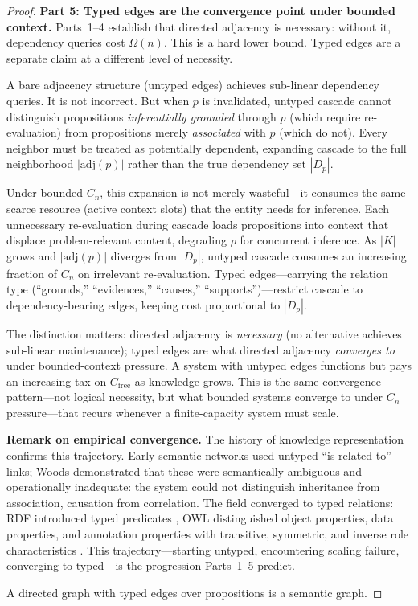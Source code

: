 \documentclass[11pt]{article}
\theoremstyle{definition}
\begin{document}
\begin{proof}
\textbf{Part 5: Typed edges are the convergence point under bounded
context.}
Parts~1--4 establish that directed adjacency is necessary: without it,
dependency queries cost $\Omega(n)$. This is a hard lower bound. Typed
edges are a separate claim at a different level of necessity.

A bare adjacency structure (untyped edges) achieves sub-linear
dependency queries. It is not incorrect. But when $p$ is invalidated,
untyped cascade cannot distinguish propositions \emph{inferentially
grounded} through $p$ (which require re-evaluation) from propositions
merely \emph{associated} with $p$ (which do not). Every neighbor must
be treated as potentially dependent, expanding cascade to the full
neighborhood $|\mathrm{adj}(p)|$ rather than the true dependency set
$|D_p|$.

Under bounded $C_n$, this expansion is not merely wasteful---it
consumes the same scarce resource (active context slots) that the
entity needs for inference. Each unnecessary re-evaluation during
cascade loads propositions into context that displace
problem-relevant content, degrading $\rho$ for concurrent inference.
As $|K|$ grows and $|\mathrm{adj}(p)|$ diverges from $|D_p|$, untyped
cascade consumes an increasing fraction of $C_n$ on irrelevant
re-evaluation. Typed edges---carrying the relation type (``grounds,''
``evidences,'' ``causes,'' ``supports'')---restrict cascade to
dependency-bearing edges, keeping cost proportional to $|D_p|$.

The distinction matters: directed adjacency is \emph{necessary} (no
alternative achieves sub-linear maintenance); typed edges are what
directed adjacency \emph{converges to} under bounded-context
pressure. A system with untyped edges functions but pays an
increasing tax on $C_{\mathrm{free}}$ as knowledge grows. This is
the same convergence pattern---not logical necessity, but what
bounded systems converge to under $C_n$ pressure---that recurs
whenever a finite-capacity system must scale.

\textbf{Remark on empirical convergence.}
The history of knowledge representation confirms this trajectory.
Early semantic networks used untyped ``is-related-to'' links;
Woods \cite{Woods1975} demonstrated that these were semantically
ambiguous and operationally inadequate: the system could not
distinguish inheritance from association, causation from correlation.
The field converged to typed relations: RDF introduced typed
predicates \cite{BernersLee2001}, OWL distinguished object properties,
data properties, and annotation properties with transitive, symmetric,
and inverse role characteristics \cite{BaaderCalvaneseEtAl2003}.
This trajectory---starting untyped, encountering scaling failure,
converging to typed---is the progression Parts~1--5 predict.

A directed graph with typed edges over propositions is a semantic graph.
\end{proof}
\end{document}
